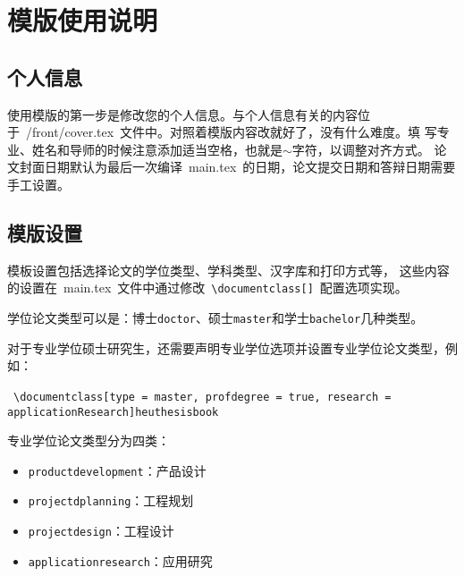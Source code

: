 
%
%
%

\chapter{模版使用说明}
\label{chap03}

\section{个人信息}

使用模版的第一步是修改您的个人信息。与个人信息有关的内容位
于~{/front/cover.tex}~文件中。对照着模版内容改就好了，没有什么难度。填
写专业、姓名和导师的时候注意添加适当空格，也就是$\sim$字符，以调整对齐方式。
论文封面日期默认为最后一次编译~main.tex~的日期，论文提交日期和答辩日期需要手工设置。

\section{模版设置}

模板设置包括选择论文的学位类型、学科类型、汉字库和打印方式等，
这些内容的设置在~main.tex~文件中通过修改~\texttt{\textbackslash documentclass[]}~配置选项实现。

学位论文类型可以是：博士\texttt{doctor}、硕士\texttt{master}和学士\texttt{bachelor}几种类型。

对于专业学位硕士研究生，还需要声明专业学位选项并设置专业学位论文类型，例如：

~\texttt{\textbackslash documentclass[type = master, profdegree = true, research = applicationResearch]{heuthesisbook}}

专业学位论文类型分为四类：
\begin{itemize}
  \item \texttt{productdevelopment}：产品设计
  \item \texttt{projectdplanning}：工程规划
  \item \texttt{projectdesign}：工程设计
  \item \texttt{applicationresearch}：应用研究
\end{itemize}


